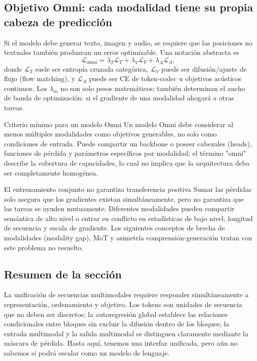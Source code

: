 \subsection{Objetivo Omni: cada modalidad tiene su propia cabeza de predicción}

Si el modelo debe generar texto, imagen y audio, se requiere que las posiciones no textuales también produzcan un error optimizable. Una notación abstracta es
$$
\mathcal{L}_{\text{omni}}
=\lambda_T\mathcal{L}_{T}
+\lambda_V\mathcal{L}_{V}
+\lambda_A\mathcal{L}_{A},
$$
donde $\mathcal{L}_{T}$ suele ser entropía cruzada categórica, $\mathcal{L}_{V}$ puede ser difusión/ajuste de flujo (flow matching), y $\mathcal{L}_{A}$ puede ser CE de token-codec u objetivos acústicos continuos. Los $\lambda_m$ no son solo pesos matemáticos; también determinan el ancho de banda de optimización: si el gradiente de una modalidad ahogará a otras tareas.


\begin{importantbox}{Criterio mínimo para un modelo Omni}
Un modelo Omni debe considerar al menos múltiples modalidades como objetivos generables, no solo como condiciones de entrada. Puede compartir un backbone o poseer cabezales (heads), funciones de pérdida y parámetros específicos por modalidad; el término "omni" describe la cobertura de capacidades, lo cual no implica que la arquitectura deba ser completamente homogénea.
\end{importantbox}

\begin{warningbox}{El entrenamiento conjunto no garantiza transferencia positiva}
Sumar las pérdidas solo asegura que los gradientes existan simultáneamente, pero no garantiza que las tareas se ayuden mutuamente. Diferentes modalidades pueden compartir semántica de alto nivel o entrar en conflicto en estadísticas de bajo nivel, longitud de secuencia y escala de gradiente. Los siguientes conceptos de brecha de modalidades (modality gap), MoT y asimetría comprensión-generación tratan con este problema no resuelto.
\end{warningbox}

\subsection{Resumen de la sección}

La unificación de secuencias multimodales requiere responder simultáneamente a representación, ordenamiento y objetivo. Los tokens son unidades de secuencia que no deben ser discretos; la autoregresión global establece las relaciones condicionales entre bloques sin excluir la difusión dentro de los bloques; la entrada multimodal y la salida multimodal se distinguen claramente mediante la máscara de pérdida. Hasta aquí, tenemos una interfaz unificada, pero aún no sabemos si podrá escalar como un modelo de lenguaje.


